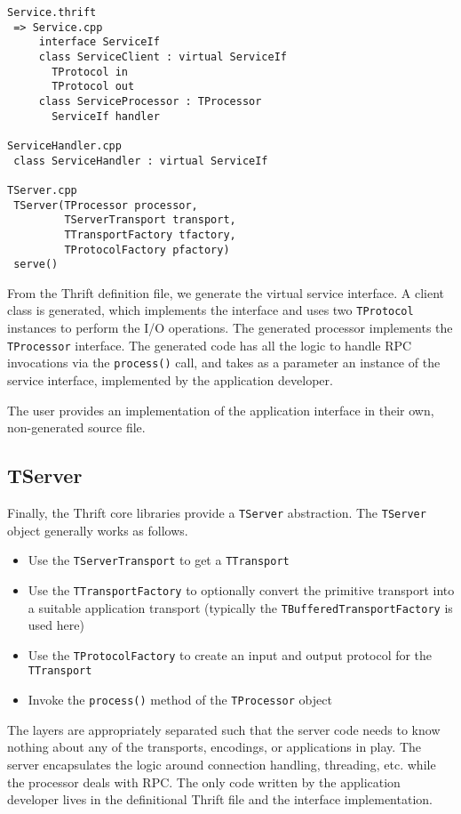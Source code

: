 \documentclass[nocopyrightspace,blockstyle]{sigplanconf}
\begin{document}
\begin{verbatim}
Service.thrift
 => Service.cpp
     interface ServiceIf
     class ServiceClient : virtual ServiceIf
       TProtocol in
       TProtocol out
     class ServiceProcessor : TProcessor
       ServiceIf handler

ServiceHandler.cpp
 class ServiceHandler : virtual ServiceIf

TServer.cpp
 TServer(TProcessor processor,
         TServerTransport transport,
         TTransportFactory tfactory,
         TProtocolFactory pfactory)
 serve()
\end{verbatim}

From the Thrift definition file, we generate the virtual service interface.
A client class is generated, which implements the interface and
uses two \texttt{TProtocol} instances to perform the I/O operations. The
generated processor implements the \texttt{TProcessor} interface. The generated
code has all the logic to handle RPC invocations via the \texttt{process()}
call, and takes as a parameter an instance of the service interface,
implemented by the application developer.

The user provides an implementation of the application interface in their own,
non-generated source file.

\subsection{TServer}

Finally, the Thrift core libraries provide a \texttt{TServer} abstraction.
The \texttt{TServer} object generally works as follows.

\begin{itemize}
\item Use the \texttt{TServerTransport} to get a \texttt{TTransport}
\item Use the \texttt{TTransportFactory} to optionally convert the primitive
transport into a suitable application transport (typically the
\texttt{TBufferedTransportFactory} is used here)
\item Use the \texttt{TProtocolFactory} to create an input and output protocol
for the \texttt{TTransport}
\item Invoke the \texttt{process()} method of the \texttt{TProcessor} object
\end{itemize}

The layers are appropriately separated such that the server code needs to know
nothing about any of the transports, encodings, or applications in play. The
server encapsulates the logic around connection handling, threading, etc.
while the processor deals with RPC. The only code written by the application
developer lives in the definitional Thrift file and the interface
implementation.
\end{document}
